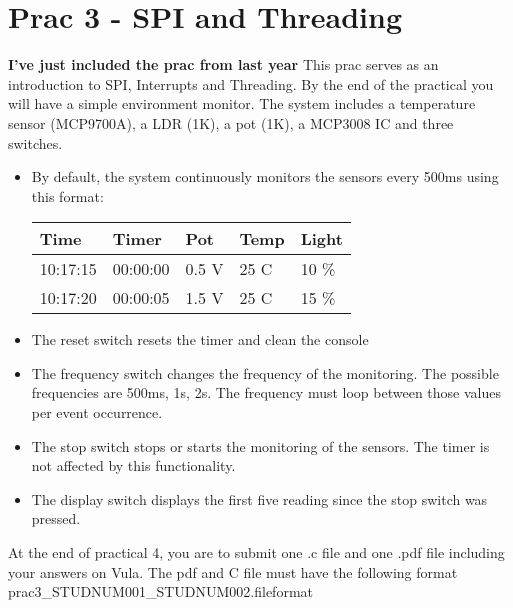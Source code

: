 \section{Prac 3 - SPI and Threading}
\label{sec:Prac3}
\textbf{I've just included the prac from last year}
This prac serves as an introduction to SPI, Interrupts and Threading. By the end of the practical you will have a simple environment monitor. The system includes a temperature sensor (MCP9700A), a LDR (1K), a pot (1K), a MCP3008 IC and three switches.

\begin{itemize}
    \item By default, the system continuously monitors the sensors every 500ms using this format:
    \begin{table}[H]
    \centering
    \begin{tabular}{|l|l|l|l|l|}
    \hline
    Time     & Timer    & Pot   & Temp & Light \\ \hline
    10:17:15 & 00:00:00 & 0.5 V & 25 C & 10 \% \\ \hline
    10:17:20 & 00:00:05 & 1.5 V & 25 C & 15 \% \\ \hline
    \end{tabular}
    \end{table}
    \item The reset switch resets the timer and clean the console
    \item The frequency switch changes the frequency of the monitoring. The possible frequencies are 500ms, 1s, 2s. The frequency must loop between those values per event occurrence.
    \item The stop switch stops or starts the monitoring of the sensors. The timer is not affected by this functionality.
    \item The display switch displays the first five reading since the stop switch was pressed.
\end{itemize}


At the end of practical 4, you are to submit one .c file and one .pdf file including your answers on Vula. The pdf and C file must have the following format prac3\_STUDNUM001\_STUDNUM002.fileformat